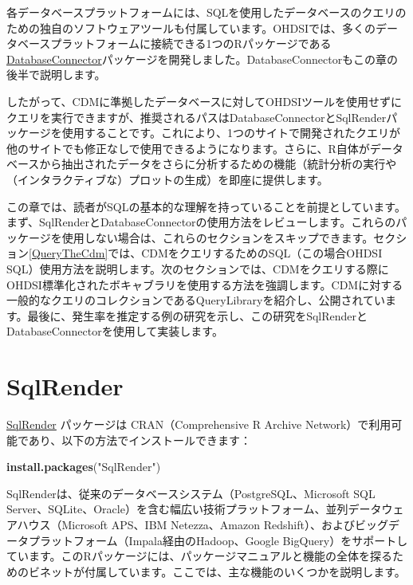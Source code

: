 \documentclass[
  11pt]{book}
\newenvironment{Shaded}{\begin{snugshade}}{\end{snugshade}}
\newcommand{\FunctionTok}[1]{\textcolor[rgb]{0.13,0.29,0.53}{\textbf{#1}}}
\newcommand{\NormalTok}[1]{#1}
\newcommand{\StringTok}[1]{\textcolor[rgb]{0.31,0.60,0.02}{#1}}
\theoremstyle{definition}
\theoremstyle{definition}
\theoremstyle{definition}
\theoremstyle{definition}
\theoremstyle{remark}
\begin{document}
各データベースプラットフォームには、SQLを使用したデータベースのクエリのための独自のソフトウェアツールも付属しています。OHDSIでは、多くのデータベースプラットフォームに接続できる1つのRパッケージである\href{https://ohdsi.github.io/DatabaseConnector/}{DatabaseConnector}パッケージを開発しました。DatabaseConnectorもこの章の後半で説明します。 

したがって、CDMに準拠したデータベースに対してOHDSIツールを使用せずにクエリを実行できますが、推奨されるパスはDatabaseConnectorとSqlRenderパッケージを使用することです。これにより、1つのサイトで開発されたクエリが他のサイトでも修正なしで使用できるようになります。さらに、R自体がデータベースから抽出されたデータをさらに分析するための機能（統計分析の実行や（インタラクティブな）プロットの生成）を即座に提供します。 

この章では、読者がSQLの基本的な理解を持っていることを前提としています。まず、SqlRenderとDatabaseConnectorの使用方法をレビューします。これらのパッケージを使用しない場合は、これらのセクションをスキップできます。セクション\ref{QueryTheCdm}では、CDMをクエリするためのSQL（この場合OHDSI SQL）使用方法を説明します。次のセクションでは、CDMをクエリする際にOHDSI標準化されたボキャブラリを使用する方法を強調します。CDMに対する一般的なクエリのコレクションであるQueryLibraryを紹介し、公開されています。最後に、発生率を推定する例の研究を示し、この研究をSqlRenderとDatabaseConnectorを使用して実装します。  

\section{SqlRender}\label{SqlRender}

\href{https://ohdsi.github.io/SqlRender/}{SqlRender} パッケージは CRAN（Comprehensive R Archive Network）で利用可能であり、以下の方法でインストールできます：

\begin{Shaded}
\begin{Highlighting}[]
\FunctionTok{install.packages}\NormalTok{(}\StringTok{"SqlRender"}\NormalTok{)}
\end{Highlighting}
\end{Shaded}

SqlRenderは、従来のデータベースシステム（PostgreSQL、Microsoft SQL Server、SQLite、Oracle）を含む幅広い技術プラットフォーム、並列データウェアハウス（Microsoft APS、IBM Netezza、Amazon Redshift）、およびビッグデータプラットフォーム（Impala経由のHadoop、Google BigQuery）をサポートしています。このRパッケージには、パッケージマニュアルと機能の全体を探るためのビネットが付属しています。ここでは、主な機能のいくつかを説明します。
\end{document}
